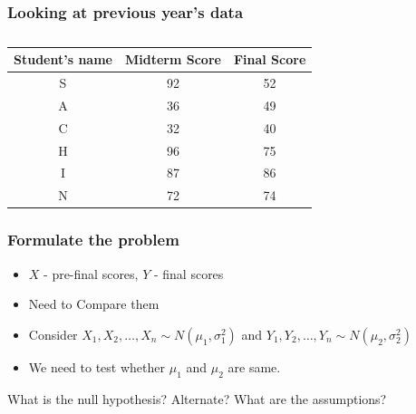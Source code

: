\documentclass{beamer}\usepackage[]{graphicx}\usepackage[]{color}
\begin{document}
\begin{frame}

\frametitle{Looking at previous year's data}

\begin{table}[!ht]
\caption{}
\centering
\label{tab:data}
\vspace{0.1in}
\begin{tabular}{c c c}
\hline
Student's name & Midterm Score & Final Score \\
\hline\hline
S & 92  & 52 \\ 
A & 36 &  49 \\ 
C & 32 & 40 \\ 
H & 96 & 75 \\ 
I & 87 & 86 \\ 
N & 72 & 74 \\ 
\hline
\end{tabular}
\end{table}


\end{frame}

\begin{frame}
\frametitle{Formulate the problem}


\begin{itemize}

\item $X$ - pre-final scores, $Y$ - final scores 

\item Need to Compare them 

\item Consider $X_1,X_2,\hdots,X_n \sim N(\mu_1,\sigma_1^2)$ and $Y_1,Y_2,\hdots,Y_n\sim N(\mu_2,\sigma_2^2)$ 

\item We need to test whether $\mu_1$ and $\mu_2$ are same. \pause

\end{itemize}

\begin{center}
What is the null hypothesis? Alternate? What are the assumptions?
\end{center}

\end{frame}
\end{document}

